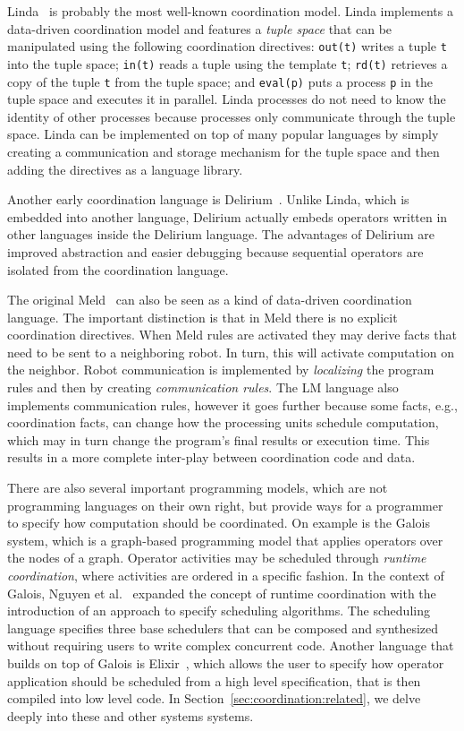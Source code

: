 Linda~\cite{linda} is probably the most well-known coordination model. Linda
implements a data-driven coordination model and features a \emph{tuple space}
that can be manipulated using the following coordination directives:
\texttt{out(t)} writes a tuple \texttt{t} into the tuple space; \texttt{in(t)}
reads a tuple using the template \texttt{t}; \texttt{rd(t)} retrieves a copy of
the tuple \texttt{t} from the tuple space; and \texttt{eval(p)} puts a process
\texttt{p} in the tuple space and executes it in parallel.  Linda processes do
not need to know the identity of other processes because processes only
communicate through the tuple space.  Linda can be implemented on top of many
popular languages by simply creating a communication and storage mechanism for
the tuple space and then adding the directives as a language library.

Another early coordination language is Delirium~\cite{Delirium}. Unlike Linda,
which is embedded into another language, Delirium actually embeds operators
written in other languages inside the Delirium language. The advantages of
Delirium are improved abstraction and easier debugging because sequential
operators are isolated from the coordination language.

The original Meld~\cite{ashley-rollman-iclp09} can also be seen as a kind of
data-driven coordination language. The important distinction is that in Meld
there is no explicit coordination directives. When Meld rules are activated they
may derive facts that need to be sent to a neighboring robot. In turn, this will
activate computation on the neighbor. Robot communication is implemented by
\emph{localizing} the program rules and then by creating \emph{communication
rules}. The LM language also implements communication rules, however it goes
further because some facts, e.g., coordination facts, can change how the
processing units schedule computation, which may in turn change the program's
final results or execution time. This results in a more complete inter-play
between coordination code and data.

There are also several important programming models, which are not programming
languages on their own right, but provide ways for a programmer to specify how
computation should be coordinated. On example is the
Galois~\cite{Pingali:2011:TPA:1993316.1993501} system, which is a graph-based
programming model that applies operators over the nodes of a graph. Operator
activities may be scheduled through \emph{runtime coordination}, where
activities are ordered in a specific fashion. In the context of Galois, Nguyen
et al.~\cite{nguyen11} expanded the concept of runtime coordination with the
introduction of an approach to specify scheduling algorithms. The scheduling
language specifies three base schedulers that can be composed and synthesized
without requiring users to write complex concurrent code.  Another language that
builds on top of Galois is Elixir~\cite{Prountzos:2012:ESS:2384616.2384644},
which allows the user to specify how operator application should be scheduled
from a high level specification, that is then compiled into low level code. In
Section~\ref{sec:coordination:related}, we delve deeply into these and other
systems systems.
